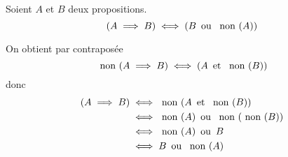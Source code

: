 \begin{prop}
	Soient $A$ et $B$ deux propositions. \[
		(A \implies B) \iff (B \ou \non(A))
	\]
\end{prop}

\begin{prv}
	On obtient par contraposée \[
		\non(A \implies B) \iff (A \et \non(B))
	\] donc 
	\begin{align*}
		(A \implies B) &\iff \non(A \et\non(B))\\
									 &\iff\non(A)\ou\non(\non(B))\\
									 &\iff\non(A)\ou B\\
									 &\iff B \ou\non(A)
	\end{align*}
\end{prv}
